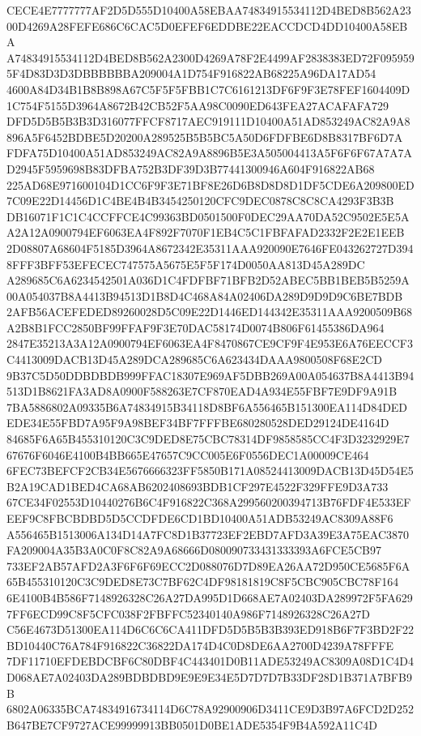 \documentclass[UTF8,fontset=fandol,zihao=-4,a4paper]{ctexart}
\begin{document}
{{CECE4E7777777AF2D5D555D10400A58EBAA74834915534112D4BED8B562A2300D4269A28FEFE686C6CAC5D0EFEF6EDDBE22EACCDCD4DD10400A58EBA
A74834915534112D4BED8B562A2300D4269A78F2E4499AF2838383ED72F0959595F4D83D3D3DBBBBBBA209004A1D754F916822AB68225A96DA17AD54
4600A84D34B1B8B898A67C5F5F5FBB1C7C6161213DF6F9F3E78FEF1604409D1C754F5155D3964A8672B42CB52F5AA98C0090ED643FEA27ACAFAFA729
DFD5D5B5B3B3D316077FFCF8717AEC919111D10400A51AD853249AC82A9A8896A5F6452BDBE5D20200A289525B5B5BC5A50D6FDFBE6D8B8317BF6D7A
FDFA75D10400A51AD853249AC82A9A8896B5E3A505004413A5F6F6F67A7A7AD2945F5959698B83DFBA752B3DF39D3B77441300946A604F916822AB68
225AD68E971600104D1CC6F9F3E71BF8E26D6B8D8D8D1DF5CDE6A209800ED7C09E22D14456D1C4BE4B4B3454250120CFC9DEC0878C8C8CA4293F3B3B
DB16071F1C1C4CCFFCE4C99363BD0501500F0DEC29AA70DA52C9502E5E5AA2A12A0900794EF6063EA4F892F7070F1EB4C5C1FBFAFAD2332F2E2E1EEB
2D08807A68604F5185D3964A8672342E35311AAA920090E7646FE043262727D3948FFF3BFF53EFECEC747575A5675E5F5F174D0050AA813D45A289DC
A289685C6A6234542501A036D1C4FDFBF71BFB2D52ABEC5BB1BEB5B5259A00A054037B8A4413B94513D1B8D4C468A84A02406DA289D9D9D9C6BE7BDB
2AFB56ACEFEDED89260028D5C09E22D1446ED144342E35311AAA9200509B68A2B8B1FCC2850BF99FFAF9F3E70DAC58174D0074B806F61455386DA964
2847E35213A3A12A0900794EF6063EA4F8470867CE9CF9F4E953E6A76EECCF3C4413009DACB13D45A289DCA289685C6A623434DAAA9800508F68E2CD
9B37C5D50DDBDBDB999FFAC18307E969AF5DBB269A00A054637B8A4413B94513D1B8621FA3AD8A0900F588263E7CF870EAD4A934E55FBF7E9DF9A91B
7BA5886802A09335B6A74834915B34118D8BF6A556465B151300EA114D84DEDEDE34E55FBD7A95F9A98BEF34BF7FFFBE680280528DED29124DE4164D
84685F6A65B455310120C3C9DED8E75CBC78314DF9858585CC4F3D3232929E767676F6046E4100B4BB665E47657C9CC005E6F0556DEC1A00009CE464
6FEC73BEFCF2CB34E5676666323FF5850B171A08524413009DACB13D45D54E5B2A19CAD1BED4CA68AB6202408693BDB1CF297E4522F329FFE9D3A733
67CE34F02553D10440276B6C4F916822C368A299560200394713B76FDF4E533EFEEF9C8FBCBDBD5D5CCDFDE6CD1BD10400A51ADB53249AC8309A88F6
A556465B1513006A134D14A7FC8D1B37723EF2EBD7AFD3A39E3A75EAC3870FA209004A35B3A0C0F8C82A9A68666D080090733431333393A6FCE5CB97
733EF2AB57AFD2A3F6F6F69ECC2D088076D7D89EA26AA72D950CE5685F6A65B455310120C3C9DED8E73C7BF62C4DF98181819C8F5CBC905CBC78F164
6E4100B4B586F7148926328C26A27DA995D1D668AE7A02403DA289972F5FA6297FF6ECD99C8F5CFC038F2FBFFC52340140A986F7148926328C26A27D
C56E4673D51300EA114D6C6C6CA411DFD5D5B5B3B393ED918B6F7F3BD2F22BD10440C76A784F916822C36822DA174D4C0D8DE6AA2700D4239A78FFFE
7DF11710EFDEBDCBF6C80DBF4C443401D0B11ADE53249AC8309A08D1C4D4D068AE7A02403DA289BDBDBD9E9E9E34E5D7D7D7B33DF28D1B371A7BFB9B
6802A06335BCA74834916734114D6C78A92900906D3411CE9D3B97A6FCD2D252B647BE7CF9727ACE99999913BB0501D0BE1ADE5354F9B4A592A11C4D
}}
\end{document}
